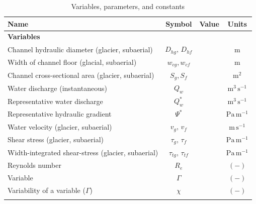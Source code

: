 \documentclass[draft]{agujournal2019}
\begin{document}
  \begin{table}[H]
    \centering
    \caption{Variables, parameters, and constants }
    \begin{tabular}{ l  c  c c }
      Name &Symbol&  Value&Units \\ \hline
      \textbf{Variables}  & & & \\
      Channel hydraulic diameter (glacier, subaerial) &  $D_{hg},\,D_{hf}$&  & $\mathrm{m}$     \\
      Width of channel floor (glacial, subaerial) & $w_{cg},w_{cf}$&  & $\mathrm{m}$     \\
      Channel cross-sectional area (glacier, subaerial) &  $S_g, S_f$& & $\mathrm{m^2}$     \\
      Water discharge (instantaneous) & $Q_w$& & $\mathrm{m^{3}\,s^{-1}}$ \\
      Representative water discharge & $Q_{w}^*$& & $\mathrm{m^{3}\,s^{-1}}$ \\
      Representative hydraulic gradient  &$\Psi^*$ & & $\mathrm{Pa\, m^{-1}}$\\
      Water velocity (glacier, subaerial)  & $v_g,\,v_{f}$& & $\mathrm{m\,s^{-1}}$ \\
      Shear stress (glacier, subaerial) & $\tau_g,\,\tau_f$&& $\mathrm{Pa \, m^{-1}}$ \\
      Width-integrated shear-stress (glacier, subaerial) & $\tau_{tg},\, \tau_{tf}$&& $\mathrm{Pa \, m^{-1}}$ \\
      Reynolds number &$R_e$& & $\mathrm{(-)}$\\
      Variable &$\Gamma$&&$\mathrm{(-)}$\\
      Variability of a variable ($\Gamma$) &$\chi$& &$\mathrm{(-)}$\\
           &&&\\
      

\end{tabular}
\end{table}
\end{document}
